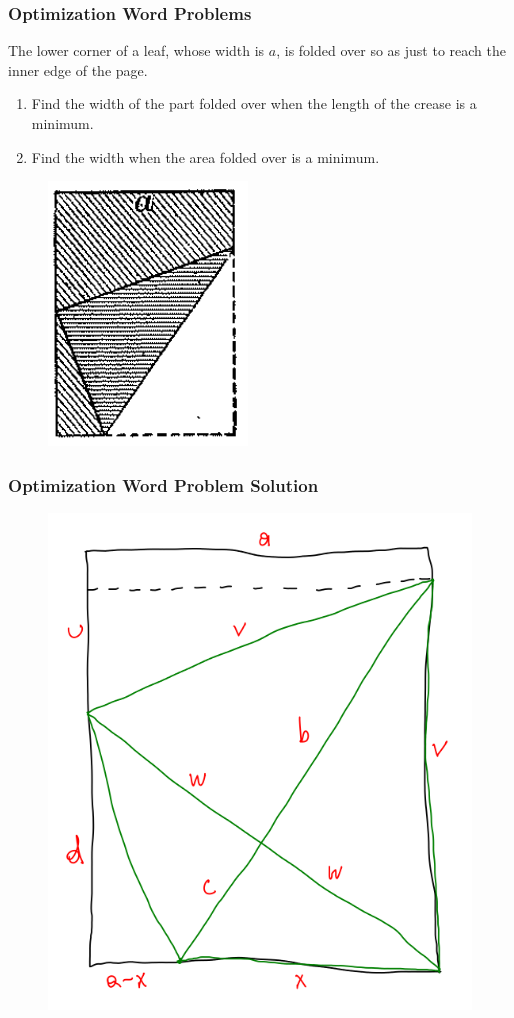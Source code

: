 \documentclass[xcolor=dvipsnames]{beamer}
\begin{document}
\begin{frame}
  \frametitle{Optimization Word Problems}
  {\ubung} The lower corner of a leaf, whose width is $a$, is folded
  over so as just to reach the inner edge of the page.
  \begin{enumerate}
  \item Find the width of the part folded over when the length of the
    crease is a minimum.
  \item Find the width when the area folded over is a minimum.
  \end{enumerate}
  \begin{figure}[h]
    \includegraphics[scale=.4]{./diagrams/optleaf.png}
  \end{figure}
\end{frame}

\begin{frame}
  \frametitle{Optimization Word Problem Solution}
  \begin{figure}[h]
    \includegraphics[scale=.35]{./diagrams/optleafsol.png}
  \end{figure}
\end{frame}
\end{document}
